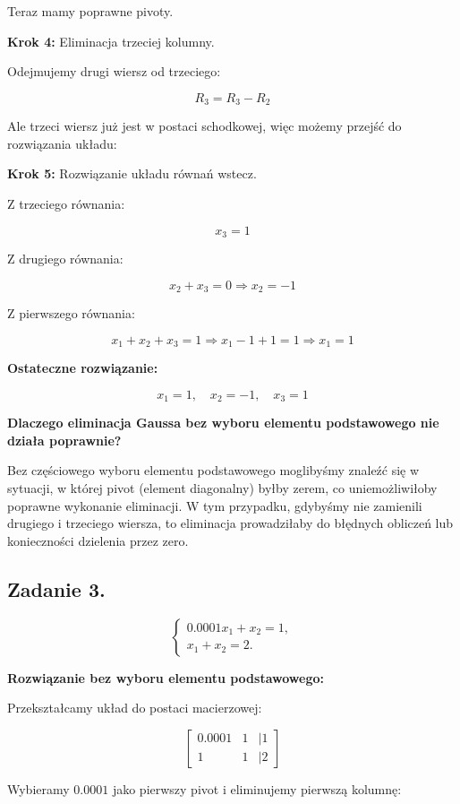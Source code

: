 \documentclass{article}
\begin{document}
Teraz mamy poprawne pivoty.

\textbf{Krok 4:} Eliminacja trzeciej kolumny.

Odejmujemy drugi wiersz od trzeciego:

\[
R_3 = R_3 - R_2
\]

Ale trzeci wiersz już jest w postaci schodkowej, więc możemy przejść do rozwiązania układu:

\textbf{Krok 5:} Rozwiązanie układu równań wstecz.

Z trzeciego równania:

\[
x_3 = 1
\]

Z drugiego równania:

\[
x_2 + x_3 = 0 \Rightarrow x_2 = -1
\]

Z pierwszego równania:

\[
x_1 + x_2 + x_3 = 1 \Rightarrow x_1 - 1 + 1 = 1 \Rightarrow x_1 = 1
\]

\textbf{Ostateczne rozwiązanie:}

\[
x_1 = 1, \quad x_2 = -1, \quad x_3 = 1
\]

\textbf{Dlaczego eliminacja Gaussa bez wyboru elementu podstawowego nie działa poprawnie?}

Bez częściowego wyboru elementu podstawowego moglibyśmy znaleźć się w sytuacji, w której pivot (element diagonalny) byłby zerem, co uniemożliwiłoby poprawne wykonanie eliminacji. W tym przypadku, gdybyśmy nie zamienili drugiego i trzeciego wiersza, to eliminacja prowadziłaby do błędnych obliczeń lub konieczności dzielenia przez zero.

\subsection{Zadanie 3.}

\[
\begin{cases}
0.0001x_1 + x_2 = 1, \\
x_1 + x_2 = 2.
\end{cases}
\]

\textbf{Rozwiązanie bez wyboru elementu podstawowego:}

Przekształcamy układ do postaci macierzowej:

\[
\begin{bmatrix}
0.0001 & 1 & | 1 \\
1 & 1 & | 2
\end{bmatrix}
\]

Wybieramy \( 0.0001 \) jako pierwszy pivot i eliminujemy pierwszą kolumnę:
\end{document}
